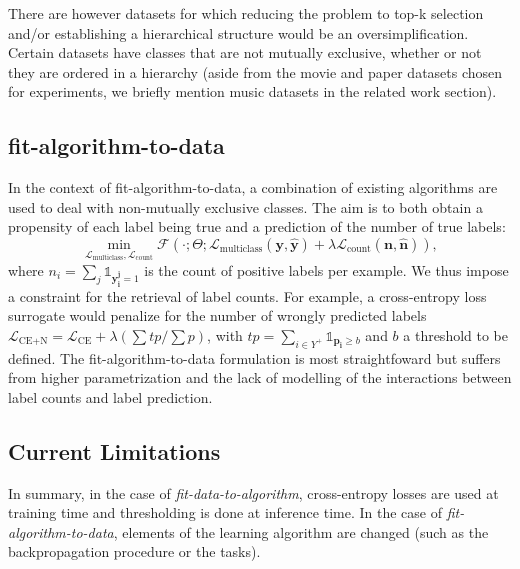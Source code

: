 There are however datasets for which reducing the problem to top-k selection and/or establishing a hierarchical structure would be an oversimplification. Certain datasets have classes that are not mutually exclusive, whether or not they are ordered in a hierarchy (aside from the movie and paper datasets chosen for experiments, we briefly mention music datasets in the related work section). 

\subsection{fit-algorithm-to-data}
In the context of fit-algorithm-to-data, a combination of existing algorithms are used to deal with non-mutually exclusive classes. The aim is to
both obtain a propensity of each label being true and a prediction of the
number of true labels:
%
\begin{equation}
\underset{\mathcal{L}_{\text {multiclass}}, \mathcal{L}_{\text {count}}}
{\min} \mathcal{F}\left(\cdot ; \Theta; \mathcal{L}_{\text {multiclass}}
(\mathbf{y}, \hat{\mathbf{y}}) + \lambda \mathcal{L}_{\text {count}}
(\mathbf{n}, \hat{\mathbf{n}})\right),
\end{equation}
%
where \(n_i = \sum_j \mathds{1}_{\mathbf{y_i^j} = 1}\) is the count of
positive labels per example. We thus impose a constraint for the retrieval of
label counts. For example, a cross-entropy loss surrogate would penalize for the number of wrongly predicted
labels \(\mathcal{L}_{\text {CE+N}}= \mathcal{L}_{\text {CE}} + \lambda (\sum
tp / \sum p)\), with \(t p=\sum_{i \in Y^{+}} \mathds{1}_{\mathbf{p_i} \geq
b}\) and \(b\) a threshold to be defined. The fit-algorithm-to-data
formulation is most straightfoward but suffers from higher parametrization and
the lack of modelling of the interactions between label counts and label
prediction.


\subsection{Current Limitations}

In summary, in the case of \emph{fit-data-to-algorithm},
cross-entropy losses are used at training time and thresholding is done at
inference time. In the case of \emph{fit-algorithm-to-data}, elements of the
learning algorithm are changed (such as the backpropagation procedure or the
tasks).

